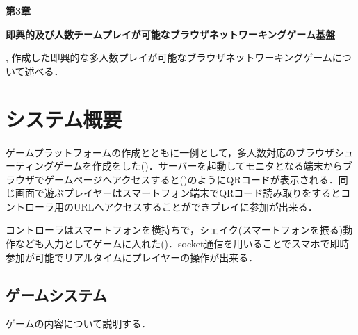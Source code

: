 \newpage
\setcounter{chapter}{3}
\setcounter{section}{0}

\begin{center}
    \vspace{0.5cm}
    \huge{\bf 第3章}
    \par
    \vspace{1cm}
    \hrulefill
    \par
    \vspace{1cm}
    \huge{\bf 即興的及び人数チームプレイが可能なブラウザネットワーキングゲーム基盤}
    \par
    \vspace{0.5cm}
    \hrulefill
    \vspace{1cm}
    \par

    \begin{flushleft}
        \large{{, 作成した即興的な多人数プレイが可能なブラウザネットワーキングゲームについて述べる．}}
    \end{flushleft}
\end{center}


\newpage
\section{システム概要}
ゲームプラットフォームの作成とともに一例として，多人数対応のブラウザシューティングゲームを作成をした()．サーバーを起動してモニタとなる端末からブラウザでゲームページへアクセスすると()のようにQRコードが表示される．同じ画面で遊ぶプレイヤーはスマートフォン端末でQRコード読み取りをするとコントローラ用のURLへアクセスすることができプレイに参加が出来る．

コントローラはスマートフォンを横持ちで，シェイク(スマートフォンを振る)動作なども入力としてゲームに入れた()．socket通信を用いることでスマホで即時参加が可能でリアルタイムにプレイヤーの操作が出来る．


\subsection{ゲームシステム}
ゲームの内容について説明する．

